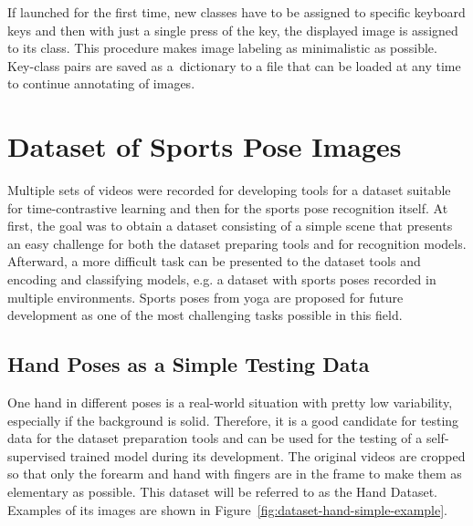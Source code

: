 If launched for the first time, new classes have to be assigned to specific keyboard keys and then with just a single press of the key, the displayed image is assigned to its class. This procedure makes image labeling as minimalistic as possible. Key-class pairs are saved as a~dictionary to a file that can be loaded at any time to continue annotating of images.

\section{\label{sec:dataset-sports-poses}Dataset of Sports Pose Images}

Multiple sets of videos were recorded for developing tools for a dataset suitable for time-contrastive learning and then for the sports pose recognition itself. At first, the goal was to obtain a dataset consisting of a simple scene that presents an easy challenge for both the dataset preparing tools and for recognition models. Afterward, a more difficult task can be presented to the dataset tools and encoding and classifying models, e.g. a dataset with sports poses recorded in multiple environments. Sports poses from yoga are proposed for future development as one of the most challenging tasks possible in this field.

\subsection{\label{sec:dataset-hand}Hand Poses as a Simple Testing Data}

One hand in different poses is a real-world situation with pretty low variability, especially if the background is solid. Therefore, it is a good candidate for testing data for the dataset preparation tools and can be used for the testing of a self-supervised trained model during its development. The original videos are cropped so that only the forearm and hand with fingers are in the frame to make them as elementary as possible. This dataset will be referred to as the Hand Dataset. Examples of its images are shown in Figure~\ref{fig:dataset-hand-simple-example}.

